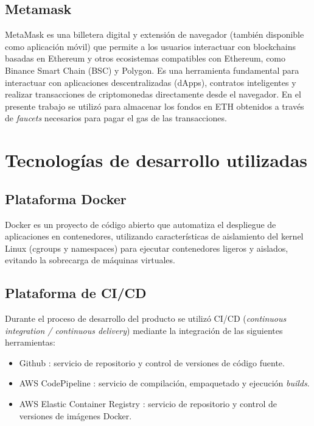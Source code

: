 \subsection{Metamask}

MetaMask \cite{metamask} es una billetera digital y extensión de navegador (también disponible como aplicación móvil) que permite a los usuarios interactuar con blockchains basadas en Ethereum y otros ecosistemas compatibles con Ethereum, como Binance Smart Chain (BSC) y Polygon. Es una herramienta fundamental para interactuar con aplicaciones descentralizadas (dApps), contratos inteligentes y realizar transacciones de criptomonedas directamente desde el navegador.
En el presente trabajo se utilizó para almacenar los fondos en ETH obtenidos a través de \textit{faucets} necesarios para pagar el gas de las transacciones.

\section{Tecnologías de desarrollo utilizadas}




\subsection{Plataforma Docker}

Docker \cite{docker_website} es un proyecto de código abierto que automatiza el despliegue de aplicaciones en contenedores, utilizando características de aislamiento del kernel Linux (cgroups y namespaces) para ejecutar contenedores ligeros y aislados, evitando la sobrecarga de máquinas virtuales.





\subsection{Plataforma de CI/CD}
Durante el proceso de desarrollo del producto se utilizó CI/CD (\textit{continuous integration / continuous delivery}) mediante la integración de las siguientes herramientas:

\begin{itemize}
	\item Github \cite{SoftwareTool_Github}: servicio de repositorio y control de versiones de código fuente.
	\item AWS CodePipeline \cite{SoftwareTool_codePipeline}: servicio de compilación, empaquetado y ejecución \textit{builds}.
	\item AWS Elastic Container Registry \cite{SoftwareTool_ECR}: servicio de repositorio y control de versiones de imágenes Docker.
\end{itemize}

